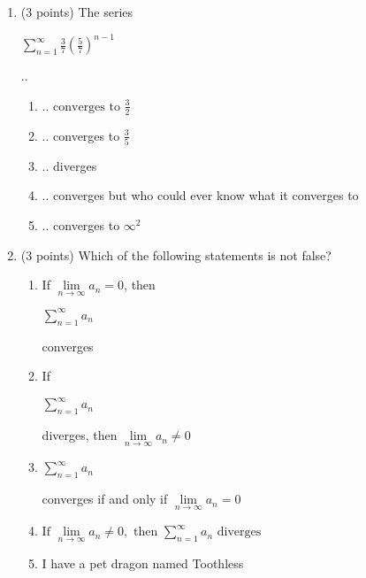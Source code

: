 \documentclass[paper=a4, fontsize=11pt]{scrartcl} %
\numberwithin{equation}{section} %
\numberwithin{figure}{section} %
\numberwithin{table}{section} %
\begin{document}
\begin{enumerate}
\item (3 points) The series \begin{large}$\sum\limits_{n=1}^\infty \frac{3}{7} \left( \frac{5}{7} \right)^{n-1}$ \end{large} ..
\vspace{2mm}
 \normalsize \begin{enumerate}
    \item $\boxed{ \text{.. converges to }\frac{3}{2}}$
    \item .. converges to $\frac{3}{5}$
    \item .. diverges
    \item .. converges but who could ever know what it converges to
    \item .. converges to $\infty^2$
  \end{enumerate}
  \vspace{2.5in}
\item (3 points) Which of the following statements is not false?
\normalsize \begin{enumerate}
    \item If $\lim\limits_{n \rightarrow \infty} a_n = 0$, then  \begin{large}$\sum\limits_{n=1}^\infty a_n$ \end{large} converges
    \item If \begin{large}$\sum\limits_{n=1}^\infty a_n$ \end{large} diverges,  then $\lim\limits_{n \rightarrow \infty} a_n \neq 0$
    \item \begin{large}$\sum\limits_{n=1}^\infty a_n$ \end{large} converges if and only if $\lim\limits_{n \rightarrow \infty} a_n = 0$
    \item $\boxed{\text{If } \lim\limits_{n \rightarrow \infty} a_n \neq 0, \text{ then } \sum\limits_{n=1}^\infty a_n \text{ diverges}}$
    \item I have a pet dragon named Toothless
  \end{enumerate}
\end{enumerate}



\end{document}
